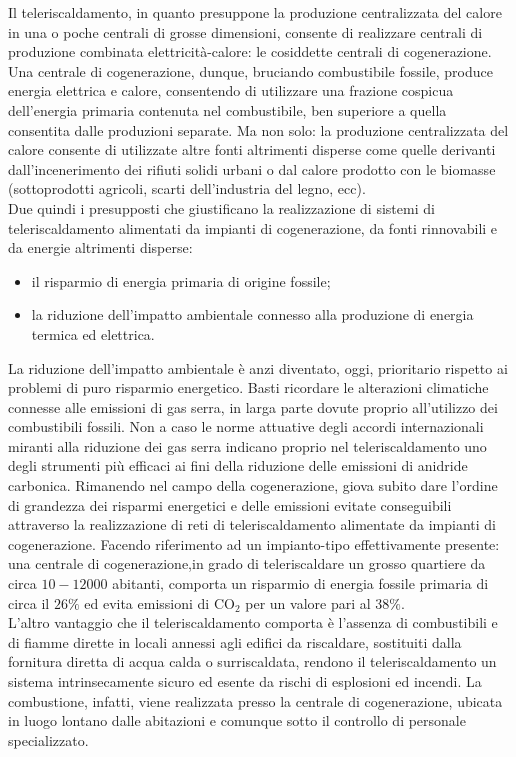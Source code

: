 \documentclass[laurea,oneside,11pt]{USiena_tesiLM3}
\begin{document}
Il teleriscaldamento, in quanto presuppone la produzione centralizzata del calore in una o poche centrali di grosse dimensioni, consente di realizzare centrali di produzione combinata elettricità-calore: le cosiddette  centrali di cogenerazione.
Una centrale di cogenerazione, dunque, bruciando combustibile fossile, produce energia elettrica e calore, consentendo di utilizzare una frazione cospicua dell'energia primaria contenuta nel combustibile, ben superiore a quella consentita dalle produzioni separate.
Ma non solo: la produzione centralizzata del calore consente di utilizzate altre fonti altrimenti disperse come quelle derivanti dall'incenerimento dei rifiuti solidi urbani o dal calore prodotto con le biomasse (sottoprodotti agricoli, scarti dell'industria del legno, ecc).\\

Due quindi i presupposti che giustificano la realizzazione di sistemi di teleriscaldamento alimentati da impianti di cogenerazione, da fonti rinnovabili e da energie altrimenti disperse:
\begin{itemize}
\item il risparmio di energia primaria di origine fossile;
\item la riduzione dell'impatto ambientale connesso alla produzione di energia termica ed elettrica.
\end{itemize}
La riduzione dell'impatto ambientale è anzi diventato, oggi, prioritario rispetto ai problemi di puro risparmio energetico. Basti ricordare le alterazioni climatiche connesse alle emissioni di gas serra, in larga parte dovute proprio all'utilizzo dei combustibili fossili. Non a caso le norme attuative degli accordi internazionali miranti alla riduzione dei gas serra indicano proprio nel teleriscaldamento uno degli strumenti più efficaci ai fini della riduzione delle emissioni di anidride carbonica.
Rimanendo nel campo della cogenerazione, giova subito dare l'ordine di grandezza dei risparmi energetici e delle emissioni evitate conseguibili attraverso la realizzazione di reti di teleriscaldamento alimentate da impianti di cogenerazione.
Facendo riferimento ad un impianto-tipo effettivamente presente: una centrale di cogenerazione,in grado di teleriscaldare un grosso quartiere da circa $10-12000$ abitanti, comporta un risparmio di energia fossile primaria di circa il $26\%$ ed evita emissioni di CO$_2$ per un valore pari al $38\%$.\\

L'altro vantaggio che il teleriscaldamento comporta è l'assenza di combustibili e di fiamme dirette in locali annessi agli edifici da riscaldare, sostituiti dalla fornitura diretta di acqua calda o surriscaldata, rendono il teleriscaldamento un sistema intrinsecamente sicuro ed esente da rischi di esplosioni ed incendi.
La combustione, infatti, viene realizzata presso la centrale di cogenerazione, ubicata in luogo lontano dalle abitazioni e comunque sotto il controllo di personale specializzato.
\end{document}
